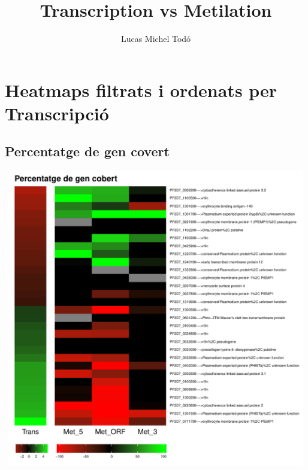 \documentclass{article}\usepackage[]{graphicx}\usepackage[]{color}
\newenvironment{knitrout}{}{} %
\begin{document}
\title{Transcription vs Metilation}
\author{Lucas Michel Todó}
\maketitle
\tableofcontents
\clearpage








\section{Heatmaps filtrats i ordenats per Transcripció}
\subsection{Percentatge de gen covert}
\begin{knitrout}
\color{fgcolor}

{\centering \includegraphics[width=20cm,height=13cm]{figure/minimal-percentatge_nou-1} 

}



\end{knitrout}
\clearpage
\end{document}
